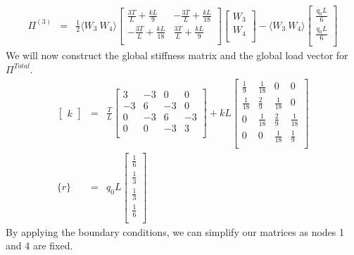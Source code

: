 \documentclass[a4paper]{article}
\begin{document}
\begin{eqnarray*}
\Pi^{(3)} & = & \frac{1}{2} \langle W_{3} \ W_{4} \rangle \begin{bmatrix}
\frac{3T}{L}+\frac{kL}{9} & -\frac{3T}{L}+ \frac{kL}{18}\\[3pt]
-\frac{3T}{L} + \frac{kL}{18} & 
\frac{3T}{L} + \frac{kL}{9}\\
\end{bmatrix}
\begin{bmatrix}
W_{3}\\
W_{4}\\
\end{bmatrix}
- \langle W_{3} \ W_{4} \rangle \begin{bmatrix}
\frac{q_{0}L}{6}\\
\frac{q_{0}L}{6}\\
\end{bmatrix}
\end{eqnarray*}
We will now construct the global stiffness matrix and the global load vector for $\Pi^{Total}$.
\begin{eqnarray*}
\begin{bmatrix}
k
\end{bmatrix} & = & \frac{T}{L}
\begin{bmatrix}
3 & -3 & 0 & 0\\
-3 & 6 & -3 & 0\\
0 & -3 & 6 & -3\\
0 & 0 & -3 & 3\\
\end{bmatrix} +
kL
\begin{bmatrix}
\frac{1}{9} & \frac{1}{18} & 0 & 0 \\[3pt]
\frac{1}{18} & \frac{2}{9} & \frac{1}{18} & 0 \\[3pt]
0 & \frac{1}{18} & \frac{2}{9} & \frac{1}{18} \\[3pt]
0 & 0 & \frac{1}{18} & \frac{1}{9} \\[3pt]
\end{bmatrix}\\
\{r\} & = & q_{0}L
\begin{bmatrix}
\frac{1}{6} \\[3pt]
\frac{1}{3} \\[3pt]
\frac{1}{3} \\[3pt]
\frac{1}{6} \\[3pt]
\end{bmatrix}
\end{eqnarray*}
By applying the boundary conditions, we can simplify our matrices as nodes 1 and 4 are fixed.
\end{document}
